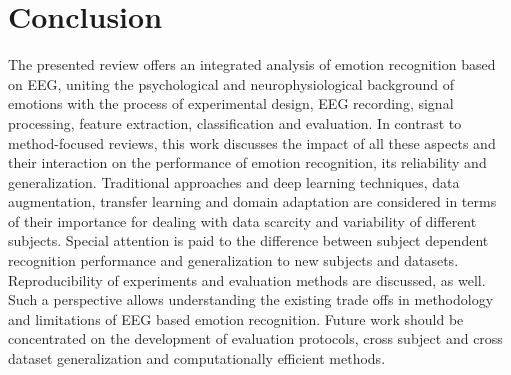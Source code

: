 \documentclass[ASNA,twocolumn]{USG}
\begin{document}
\section{Conclusion}
\label{sec:conclusion}
The presented review offers an integrated analysis of emotion recognition based on EEG, uniting the psychological and neurophysiological background of emotions with the process of experimental design, EEG recording, signal processing, feature extraction, classification and evaluation. In contrast to method-focused reviews, this work discusses the impact of all these aspects and their interaction on the performance of emotion recognition, its reliability and generalization. Traditional approaches and deep learning techniques, data augmentation, transfer learning and domain adaptation are considered in terms of their importance for dealing with data scarcity and variability of different subjects. Special attention is paid to the difference between subject dependent recognition performance and generalization to new subjects and datasets. Reproducibility of experiments and evaluation methods are discussed, as well. Such a perspective allows understanding the existing trade offs in methodology and limitations of EEG based emotion recognition. Future work should be concentrated on the development of evaluation protocols, cross subject and cross dataset generalization and computationally efficient methods.



\end{document}

